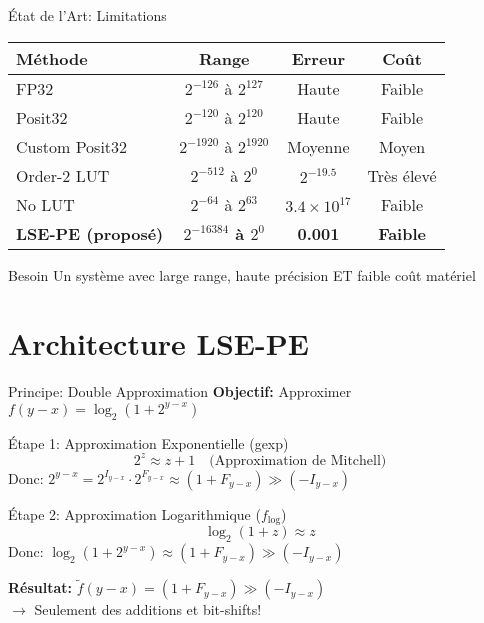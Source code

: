 \documentclass[aspectratio=169]{beamer}
\begin{document}
\begin{frame}{État de l'Art: Limitations}
\begin{table}
\small
\begin{tabular}{|l|c|c|c|}
\hline
\textbf{Méthode} & \textbf{Range} & \textbf{Erreur} & \textbf{Coût} \\
\hline
FP32 & $2^{-126}$ à $2^{127}$ & Haute & Faible \\
\hline
Posit32 & $2^{-120}$ à $2^{120}$ & Haute & Faible \\
\hline
Custom Posit32 & $2^{-1920}$ à $2^{1920}$ & Moyenne & Moyen \\
\hline
Order-2 LUT & $2^{-512}$ à $2^{0}$ & $2^{-19.5}$ & \alert{Très élevé} \\
\hline
No LUT & $2^{-64}$ à $2^{63}$ & \alert{$3.4 \times 10^{17}$} & Faible \\
\hline
\textbf{LSE-PE (proposé)} & \textbf{$2^{-16384}$ à $2^{0}$} & \textbf{0.001} & \textbf{Faible} \\
\hline
\end{tabular}
\end{table}

\vspace{0.5cm}
\begin{alertblock}{Besoin}
Un système avec large range, haute précision ET faible coût matériel
\end{alertblock}
\end{frame}

\section{Architecture LSE-PE}

\begin{frame}{Principe: Double Approximation}
\textbf{Objectif:} Approximer $f(y-x) = \log_2(1 + 2^{y-x})$

\vspace{0.3cm}
\begin{block}{Étape 1: Approximation Exponentielle (gexp)}
\[
2^z \approx z + 1 \quad \text{(Approximation de Mitchell)}
\]
Donc: $2^{y-x} = 2^{I_{y-x}} \cdot 2^{F_{y-x}} \approx (1 + F_{y-x}) \gg (-I_{y-x})$
\end{block}

\begin{block}{Étape 2: Approximation Logarithmique ($f_{\log}$)}
\[
\log_2(1 + z) \approx z
\]
Donc: $\log_2(1 + 2^{y-x}) \approx (1 + F_{y-x}) \gg (-I_{y-x})$
\end{block}

\vspace{0.3cm}
\textbf{Résultat:} $\tilde{f}(y-x) = (1 + F_{y-x}) \gg (-I_{y-x})$ \\
$\rightarrow$ Seulement des additions et bit-shifts!
\end{frame}
\end{document}
